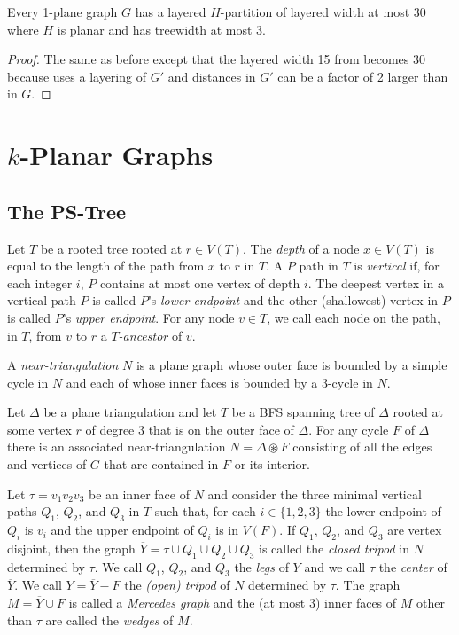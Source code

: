 \documentclass{patmorin}
\begin{document}
\begin{thm}
  Every 1-plane graph $G$ has a layered $H$-partition of layered width at most 30 where $H$ is planar and has treewidth at most 3.
\end{thm}

\begin{proof}
  The same as before except that the layered width 15 from  becomes 30 because  uses a layering of $G'$ and distances in $G'$ can be a factor of 2 larger than in $G$.
\end{proof}

\section{$k$-Planar Graphs}

\subsection{The PS-Tree}

Let $T$ be a rooted tree rooted at $r\in V(T)$. The \emph{depth} of a node $x\in V(T)$ is equal to the length of the path from $x$ to $r$ in $T$. A $P$ path in $T$ is \emph{vertical} if, for each integer $i$, $P$ contains at most one vertex of depth $i$.  The deepest vertex in a vertical path $P$ is called  $P$'s \emph{lower endpoint} and the other (shallowest) vertex in $P$ is called $P$'s \emph{upper endpoint}. For any node $v\in T$, we call each node on the path, in $T$, from $v$ to $r$ a \emph{$T$-ancestor} of $v$.

A \emph{near-triangulation} $N$ is a plane graph whose outer face is bounded by a simple cycle in $N$ and each of whose inner faces is bounded by a 3-cycle in $N$.  

Let $\Delta$ be a plane triangulation and let $T$ be a BFS spanning tree of $\Delta$ rooted at some vertex $r$ of degree 3 that is on the outer face of $\Delta$.  For any cycle $F$ of $\Delta$ there is an associated near-triangulation $N=\Delta\circledast F$ consisting of all the edges and vertices of $G$ that are contained in $F$ or its interior.

Let $\tau=v_1v_2v_3$ be an inner face of $N$ and consider the three minimal vertical paths $Q_1$, $Q_2$, and $Q_3$ in $T$ such that, for each $i\in\{1,2,3\}$ the lower endpoint of $Q_i$ is $v_i$ and the upper endpoint of $Q_i$ is in $V(F)$.  If $Q_1$, $Q_2$, and $Q_3$ are vertex disjoint, then the graph $\overline{Y}=\tau\cup Q_1\cup Q_2\cup Q_3$ is called the \emph{closed tripod} in $N$ determined by $\tau$.  We call $Q_1$, $Q_2$, and $Q_3$ the \emph{legs} of $\overline{Y}$ and we call $\tau$ the \emph{center} of $\overline{Y}$.  We call $Y=\overline{Y}-F$ the \emph{(open) tripod} of $N$ determined by $\tau$.  The graph $M=\overline{Y}\cup F$ is called a \emph{Mercedes graph} and the (at most 3) inner faces of $M$ other than $\tau$ are called the \emph{wedges} of $M$.
\end{document}
